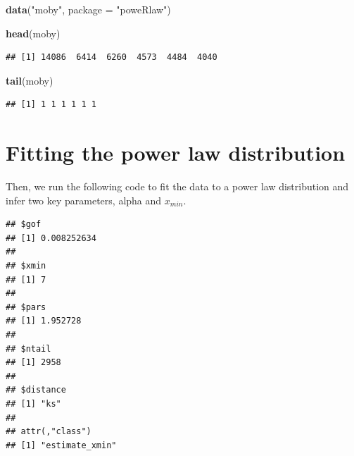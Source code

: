 \documentclass[
]{book}
\newenvironment{Shaded}{\begin{snugshade}}{\end{snugshade}}
\newcommand{\AttributeTok}[1]{\textcolor[rgb]{0.13,0.29,0.53}{#1}}
\newcommand{\CommentTok}[1]{\textcolor[rgb]{0.56,0.35,0.01}{\textit{#1}}}
\newcommand{\FunctionTok}[1]{\textcolor[rgb]{0.13,0.29,0.53}{\textbf{#1}}}
\newcommand{\NormalTok}[1]{#1}
\newcommand{\OtherTok}[1]{\textcolor[rgb]{0.56,0.35,0.01}{#1}}
\newcommand{\SpecialCharTok}[1]{\textcolor[rgb]{0.81,0.36,0.00}{\textbf{#1}}}
\newcommand{\StringTok}[1]{\textcolor[rgb]{0.31,0.60,0.02}{#1}}
\begin{document}
\begin{Shaded}
\begin{Highlighting}[]
\FunctionTok{data}\NormalTok{(}\StringTok{"moby"}\NormalTok{, }\AttributeTok{package =} \StringTok{"poweRlaw"}\NormalTok{)}

\FunctionTok{head}\NormalTok{(moby)}
\end{Highlighting}
\end{Shaded}

\begin{verbatim}
## [1] 14086  6414  6260  4573  4484  4040
\end{verbatim}

\begin{Shaded}
\begin{Highlighting}[]
\FunctionTok{tail}\NormalTok{(moby)}
\end{Highlighting}
\end{Shaded}

\begin{verbatim}
## [1] 1 1 1 1 1 1
\end{verbatim}

\section{Fitting the power law distribution}\label{fitting-the-power-law-distribution}

Then, we run the following code to fit the data to a power law distribution and infer two key parameters, alpha and \(x_{min}\).

\begin{Shaded}
\end{Shaded}

\begin{verbatim}
## $gof
## [1] 0.008252634
## 
## $xmin
## [1] 7
## 
## $pars
## [1] 1.952728
## 
## $ntail
## [1] 2958
## 
## $distance
## [1] "ks"
## 
## attr(,"class")
## [1] "estimate_xmin"
\end{verbatim}

\begin{Shaded}
\end{Shaded}
\end{document}
